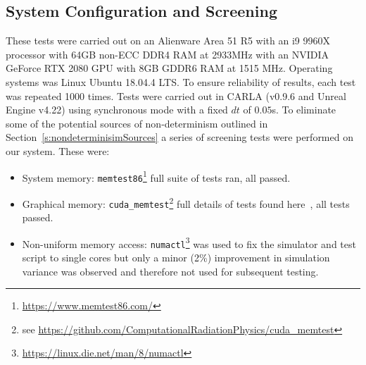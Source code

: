 \documentclass[letterpaper, 10 pt, journal, twoside]{IEEEtran}
\begin{document}
	
\subsection{System Configuration and Screening}\label{s:screening}
These tests were carried out on an Alienware Area 51 R5 with an i9 9960X processor with 64GB non-ECC DDR4 RAM at 2933MHz with an NVIDIA GeForce RTX 2080 GPU with 8GB GDDR6 RAM at 1515 MHz. Operating systems was Linux Ubuntu 18.04.4 LTS. To ensure reliability of results, each test was repeated 1000 times. Tests were carried out in CARLA (v0.9.6 and Unreal Engine v4.22) using synchronous mode with a fixed $dt$ of $0.05$s. To eliminate some of the potential sources of non-determinism outlined in Section~\ref{s:nondeterminisimSources} a series of screening tests were performed on our system. These were:

\begin{itemize}[leftmargin=*]
    \item System memory: \texttt{memtest86}\footnote{\url{https://www.memtest86.com/}} full suite of tests ran, all passed.
    \item Graphical memory: \texttt{cuda\_memtest}\footnote{see \url{https://github.com/ComputationalRadiationPhysics/cuda_memtest}} full details of tests found here~\cite{shi2009testing}, all tests passed.
    \item Non-uniform memory access: \texttt{numactl}\footnote{\url{https://linux.die.net/man/8/numactl}} was used to fix the simulator and test script to single cores but only a minor (2\%) improvement in simulation variance was observed and therefore not used for subsequent testing.
\end{itemize}


\end{document}

